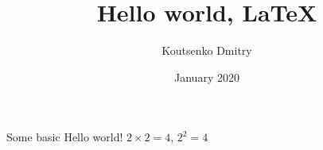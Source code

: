 \documentclass{article}
\title{Hello world, LaTeX}
\author{Koutsenko Dmitry}
\date{January 2020}
\begin{document}
\maketitle
Some basic Hello world! $2\times2=4$, $2^2=4$
\end{document}
